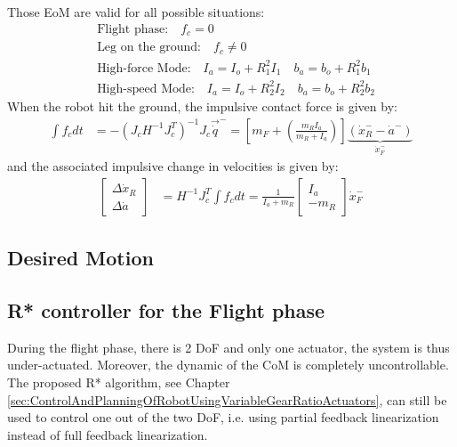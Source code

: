 %
Those EoM are valid for all possible situations:
%
\begin{align}
&\text{Flight phase:} \quad f_c = 0 \\
&\text{Leg on the ground:} \quad f_c \neq 0 \\
&\text{High-force Mode:} \quad I_a = I_o + R_1^2 I_1 \quad b_a = b_o + R_1^2 b_1 \\
&\text{High-speed Mode:} \quad I_a = I_o + R_2^2 I_2 \quad b_a = b_o + R_2^2 b_2
\end{align}
%
When the robot hit the ground, the impulsive contact force is given by:
%
\begin{align}
\int{  f_c dt } &= - \left( J_c H^{-1} J_c^T \right)^{-1}  J_c \vec{\dot{q}}^- =
\left[ m_F + (\frac{m_R I_a}{m_R + I_a}) \right] \underbrace{(\dot{x}_R^- - \dot{a}^-)}_{\dot{x}_F^-}
\label{eq:dsdm_impact_force}
\end{align}
%
and the associated impulsive change in velocities is given by:
%
\begin{align}
\left[ \begin{array}{c}
\Delta \dot{x}_R \\ \Delta \dot{a}
\end{array} \right]
 &= H^{-1} J_c^T \int{  f_c dt } = \frac{1}{I_a + m_R} \left[ \begin{array}{c}
I_a \\ -m_R
\end{array} \right] \dot{x}_F^-
\label{eq:dsdm_impact_delta}
\end{align}
%

\subsection{Desired Motion}

\subsection{R* controller for the Flight phase}

During the flight phase, there is 2 DoF and only one actuator, the system is thus under-actuated. Moreover, the dynamic of the CoM is completely uncontrollable. The proposed R* algorithm, see Chapter \ref{sec:ControlAndPlanningOfRobotUsingVariableGearRatioActuators}, can still be used to control one out of the two DoF, i.e. using partial feedback linearization instead of full feedback linearization. 

